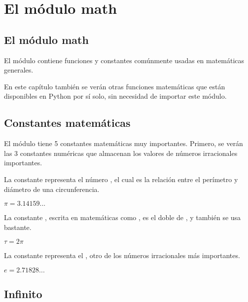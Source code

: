 \chapter{El módulo math}

\section{El módulo math}

El módulo  contiene funciones y constantes comúnmente usadas en matemáticas generales. 


En este capítulo también se verán otras funciones matemáticas que están disponibles en Python por sí solo, sin necesidad de importar este módulo.

\section{Constantes matemáticas}

El módulo  tiene 5 constantes matemáticas muy importantes. Primero, se verán las 3 constantes numéricas que almacenan los valores de números irracionales importantes.\smallskip

La constante  representa el número , el cual es la relación entre el perímetro y diámetro de una circunferencia.\smallskip

$\pi = 3.14159...$


La constante , escrita en matemáticas como , es el doble de , y también se usa bastante.\smallskip

$\tau = 2\pi$


La constante   representa el , otro de los números irracionales más importantes.\smallskip

$e = 2.71828...$


\section{Infinito}

